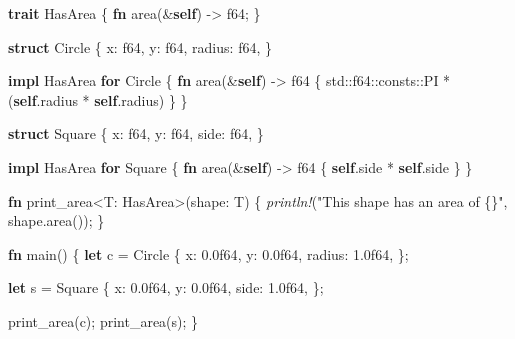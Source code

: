 \documentclass[a4paper,]{book}
\newenvironment{Shaded}{\begin{snugshade}}{\end{snugshade}}
\newcommand{\KeywordTok}[1]{\textcolor[rgb]{0.13,0.29,0.53}{\textbf{{#1}}}}
\newcommand{\DataTypeTok}[1]{\textcolor[rgb]{0.13,0.29,0.53}{{#1}}}
\newcommand{\DecValTok}[1]{\textcolor[rgb]{0.00,0.00,0.81}{{#1}}}
\newcommand{\StringTok}[1]{\textcolor[rgb]{0.31,0.60,0.02}{{#1}}}
\newcommand{\PreprocessorTok}[1]{\textcolor[rgb]{0.56,0.35,0.01}{\textit{{#1}}}}
\newcommand{\NormalTok}[1]{{#1}}
\begin{document}
\begin{Shaded}
\begin{Highlighting}[]
\KeywordTok{trait} \NormalTok{HasArea \{}
    \KeywordTok{fn} \NormalTok{area(&}\KeywordTok{self}\NormalTok{) -> }\DataTypeTok{f64}\NormalTok{;}
\NormalTok{\}}

\KeywordTok{struct} \NormalTok{Circle \{}
    \NormalTok{x: }\DataTypeTok{f64}\NormalTok{,}
    \NormalTok{y: }\DataTypeTok{f64}\NormalTok{,}
    \NormalTok{radius: }\DataTypeTok{f64}\NormalTok{,}
\NormalTok{\}}

\KeywordTok{impl} \NormalTok{HasArea }\KeywordTok{for} \NormalTok{Circle \{}
    \KeywordTok{fn} \NormalTok{area(&}\KeywordTok{self}\NormalTok{) -> }\DataTypeTok{f64} \NormalTok{\{}
        \NormalTok{std::}\DataTypeTok{f64}\NormalTok{::consts::PI * (}\KeywordTok{self}\NormalTok{.radius * }\KeywordTok{self}\NormalTok{.radius)}
    \NormalTok{\}}
\NormalTok{\}}

\KeywordTok{struct} \NormalTok{Square \{}
    \NormalTok{x: }\DataTypeTok{f64}\NormalTok{,}
    \NormalTok{y: }\DataTypeTok{f64}\NormalTok{,}
    \NormalTok{side: }\DataTypeTok{f64}\NormalTok{,}
\NormalTok{\}}

\KeywordTok{impl} \NormalTok{HasArea }\KeywordTok{for} \NormalTok{Square \{}
    \KeywordTok{fn} \NormalTok{area(&}\KeywordTok{self}\NormalTok{) -> }\DataTypeTok{f64} \NormalTok{\{}
        \KeywordTok{self}\NormalTok{.side * }\KeywordTok{self}\NormalTok{.side}
    \NormalTok{\}}
\NormalTok{\}}

\KeywordTok{fn} \NormalTok{print_area<T: HasArea>(shape: T) \{}
    \PreprocessorTok{println!}\NormalTok{(}\StringTok{"This shape has an area of \{\}"}\NormalTok{, shape.area());}
\NormalTok{\}}

\KeywordTok{fn} \NormalTok{main() \{}
    \KeywordTok{let} \NormalTok{c = Circle \{}
        \NormalTok{x: }\DecValTok{0.0f64}\NormalTok{,}
        \NormalTok{y: }\DecValTok{0.0f64}\NormalTok{,}
        \NormalTok{radius: }\DecValTok{1.0f64}\NormalTok{,}
    \NormalTok{\};}

    \KeywordTok{let} \NormalTok{s = Square \{}
        \NormalTok{x: }\DecValTok{0.0f64}\NormalTok{,}
        \NormalTok{y: }\DecValTok{0.0f64}\NormalTok{,}
        \NormalTok{side: }\DecValTok{1.0f64}\NormalTok{,}
    \NormalTok{\};}

    \NormalTok{print_area(c);}
    \NormalTok{print_area(s);}
\NormalTok{\}}
\end{Highlighting}
\end{Shaded}
\end{document}
